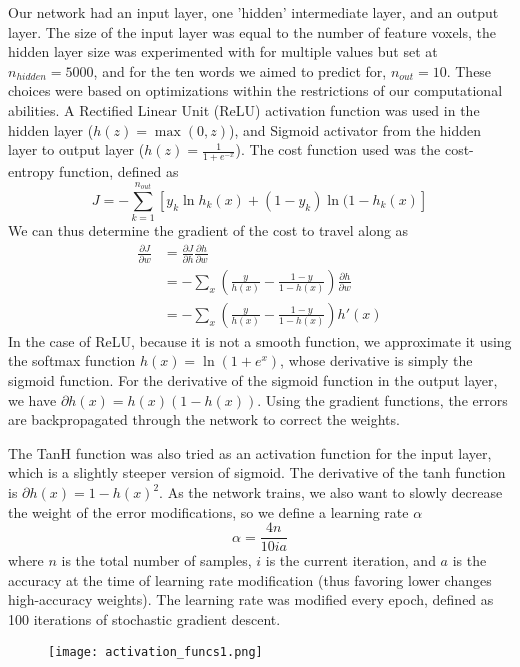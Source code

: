 \par Our network had an input layer, one 'hidden' intermediate layer, and an output layer. The size of the input layer was equal to the number of feature voxels, the hidden layer size was experimented with for multiple values but set at $n_{hidden} = 5000$, and for the ten words we aimed to predict for, $n_{out} = 10$. These choices were based on optimizations within the restrictions of our computational abilities. A Rectified Linear Unit (ReLU) activation function was used in the hidden layer ($h(z) = \max(0,z)$), and Sigmoid activator from the hidden layer to output layer ($h(z) = \frac{1}{1 + e^{-x}}$). The cost function used was the cost-entropy function, defined as
$$ J = -\sum_{k = 1}^{n_{out}} [y_k\ln h_k(x) + (1-y_k)\ln (1-h_k(x)] $$
We can thus determine the gradient of the cost to travel along as 
\begin{equation} \label{eq1}
\begin{split}
\frac{\partial J}{\partial w} & = \frac{\partial J}{\partial h} \frac{\partial h}{\partial w} \\
 & = -\sum_x \left(\frac{y}{h(x)} - \frac{1-y}{1-h(x)}\right) \frac{\partial h}{\partial w} \\
 & =-\sum_x \left(\frac{y}{h(x)} - \frac{1-y}{1-h(x)}\right) h'(x)
\end{split}
\end{equation}
In the case of ReLU, because it is not a smooth function, we approximate it using the softmax function $h(x) = \ln(1+e^x)$, whose derivative is simply the sigmoid function. For the derivative of the sigmoid function in the output layer, we have $\partial h(x) = h(x)(1-h(x))$. Using the gradient functions, the errors are backpropagated through the network to correct the weights.
\par The TanH function was also tried as an activation function for the input layer, which is a slightly steeper version of sigmoid. The derivative of the tanh function is $\partial h(x) = 1 - h(x)^2$. As the network trains, we also want to slowly decrease the weight of the error modifications, so we define a learning rate $\alpha$
$$ \alpha = \frac{4n}{10ia}$$
where $n$ is the total number of samples, $i$ is the current iteration, and $a$ is the accuracy at the time of learning rate modification (thus favoring lower changes high-accuracy weights). The learning rate was modified every epoch, defined as 100 iterations of stochastic gradient descent.

\begin{figure}
  \centering
  \texttt{[image: activation\_funcs1.png]}
  \label{fig:test1}
\end{figure}


